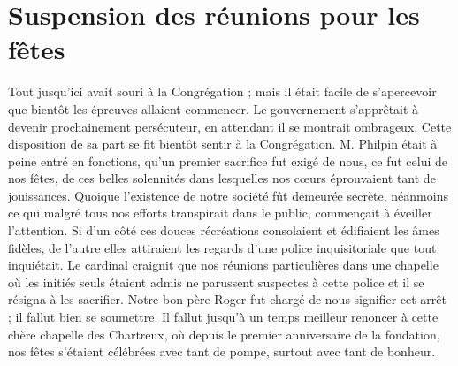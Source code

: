 \section*{Suspension des réunions pour les fêtes}
Tout jusqu'ici avait souri à la Congrégation ; mais il était facile de s'apercevoir que bientôt les épreuves allaient commencer. Le gouvernement s'apprêtait à devenir prochainement persécuteur, en attendant il se montrait ombrageux. Cette disposition de sa part se fit bientôt sentir à la Congrégation. M. Philpin était à peine entré en fonctions, qu'un premier sacrifice fut exigé de nous, ce fut celui de nos fêtes, de ces belles solennités dans lesquelles nos cœurs éprouvaient tant de jouissances. Quoique l'existence de notre société fût demeurée secrète, néanmoins ce qui malgré tous nos efforts transpirait dans le public, commençait à éveiller l'attention. Si d'un côté ces douces récréations consolaient et édifiaient les âmes fidèles, de l'autre elles attiraient les regards d'une police inquisitoriale que tout inquiétait. Le cardinal craignit que nos réunions particulières dans une chapelle où les initiés seuls étaient admis ne parussent suspectes à cette police et il se résigna à les sacrifier. Notre bon père Roger fut chargé de nous signifier cet arrêt ; il fallut bien se soumettre. Il fallut jusqu'à un temps meilleur renoncer à cette chère chapelle des Chartreux, où depuis le premier anniversaire de la fondation, nos fêtes s'étaient célébrées avec tant de pompe, surtout avec tant de bonheur.

